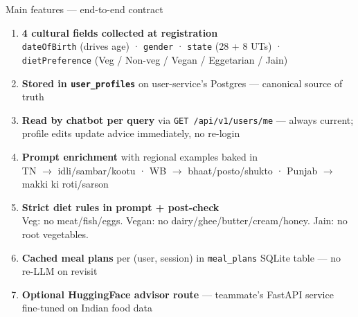 \documentclass[aspectratio=169,11pt]{beamer}
\begin{document}
\begin{frame}{Main features --- end-to-end contract}
  \footnotesize
  \begin{enumerate}
    \item \textbf{4 cultural fields collected at registration}\\
          {\scriptsize \texttt{dateOfBirth} (drives age) · \texttt{gender} · \texttt{state} (28 + 8 UTs) · \texttt{dietPreference} (Veg / Non-veg / Vegan / Eggetarian / Jain)}
    \item \textbf{Stored in \texttt{user\_profiles}} on user-service's Postgres --- canonical source of truth
    \item \textbf{Read by chatbot per query} via \texttt{GET /api/v1/users/me} --- always current; profile edits update advice immediately, no re-login
    \item \textbf{Prompt enrichment} with regional examples baked in\\
          {\scriptsize TN $\rightarrow$ idli/sambar/kootu · WB $\rightarrow$ bhaat/posto/shukto · Punjab $\rightarrow$ makki ki roti/sarson}
    \item \textbf{Strict diet rules in prompt + post-check}\\
          {\scriptsize Veg: no meat/fish/eggs. Vegan: no dairy/ghee/butter/cream/honey. Jain: no root vegetables.}
    \item \textbf{Cached meal plans} per (user, session) in \texttt{meal\_plans} SQLite table --- no re-LLM on revisit
    \item \textbf{Optional HuggingFace advisor route} --- teammate's FastAPI service fine-tuned on Indian food data
  \end{enumerate}
\end{frame}
\end{document}
